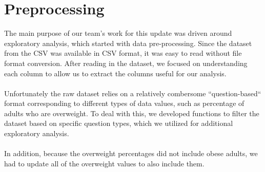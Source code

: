 \documentclass{article}
\begin{document}
\section{Preprocessing}
\label{preprocessing}
The main purpose of our team's work for this update was driven around exploratory analysis, which started with data pre-processing. Since the dataset from the CSV was available in CSV format, it was easy to read without file format conversion. After reading in the dataset, we focused on understanding each column to allow us to extract the columns useful for our analysis. 
\\\\
Unfortunately the raw dataset relies on a relatively combersome ``question-based`` format corresponding to different types of data values, such as percentage of adults who are overweight. To deal with this, we developed functions to filter the dataset based on specific question types, which we utilized for additional exploratory analysis.
\\\\ 
In addition, because the overweight percentages did not include obese adults, we had to update all of the overweight values to also include them.
\end{document}
